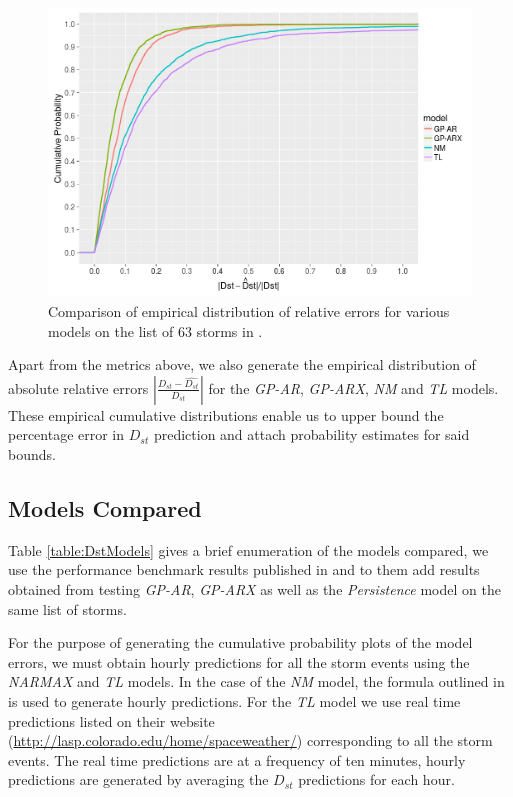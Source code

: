 \documentclass[referee,a4paper,12pt,traditabstract]{swsc}
\begin{document}
\begin{linenumbers}
\begin{figure}
   \centering
   \includegraphics[width=\textwidth]{Compare_RelProb.png}
   \caption{Comparison of empirical distribution of relative errors for various models on the list of 63 storms in \citet{Ji2012}.}
   \label{fig:relprob}
\end{figure}


Apart from the metrics above, we also generate the empirical distribution of absolute relative errors $|\frac{D_{st} - \hat{D_{st}}}{D_{st}}|$ for the \emph{GP-AR}, \emph{GP-ARX}, \emph{NM} and \emph{TL} models. These empirical cumulative distributions enable us to upper bound the percentage error in $D_{st}$ prediction and attach probability estimates for said bounds.


\subsection{Models Compared}

Table \ref{table:DstModels} gives a brief enumeration of the models compared, we use the performance benchmark results published in \citet{Ji2012} and to them add results obtained from testing \emph{GP-AR}, \emph{GP-ARX} as well as the \emph{Persistence} model on the same list of storms. 

For the purpose of generating the cumulative probability plots of the model errors, we must obtain hourly predictions for all the storm events using the \emph{NARMAX} and \emph{TL} models. In the case of the \emph{NM} model, the formula outlined in \citet{balikhin:narmax} is used to generate hourly predictions. For the \emph{TL} model we use real time predictions listed on their website (\url{http://lasp.colorado.edu/home/spaceweather/}) corresponding to all the storm events. The real time predictions are at a frequency of ten minutes, hourly predictions are generated by averaging the $D_{st}$ predictions for each hour.


\end{linenumbers}
\end{document}
